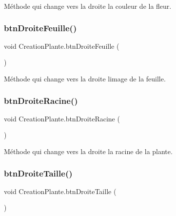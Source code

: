 Méthode qui change vers la droite la couleur de la fleur. \mbox{\label{class_creation_plante_a68b1f45a2c83168f78df6b56540e5ac8}} 
\subsubsection{\texorpdfstring{btn\+Droite\+Feuille()}{btnDroiteFeuille()}}
{\footnotesize\ttfamily void Creation\+Plante.\+btn\+Droite\+Feuille (\begin{DoxyParamCaption}{ }\end{DoxyParamCaption})\hspace{0.3cm}{\ttfamily [inline]}}

Méthode qui change vers la droite l\textquotesingle{}image de la feuille. \mbox{\label{class_creation_plante_a1c4657333f2f06b28b2b0fa8252d34d7}} 
\subsubsection{\texorpdfstring{btn\+Droite\+Racine()}{btnDroiteRacine()}}
{\footnotesize\ttfamily void Creation\+Plante.\+btn\+Droite\+Racine (\begin{DoxyParamCaption}{ }\end{DoxyParamCaption})\hspace{0.3cm}{\ttfamily [inline]}}

Méthode qui change vers la droite la racine de la plante. \mbox{\label{class_creation_plante_a13a9f44bd18d81db109f73471b01e465}} 
\subsubsection{\texorpdfstring{btn\+Droite\+Taille()}{btnDroiteTaille()}}
{\footnotesize\ttfamily void Creation\+Plante.\+btn\+Droite\+Taille (\begin{DoxyParamCaption}{ }\end{DoxyParamCaption})\hspace{0.3cm}{\ttfamily [inline]}}

